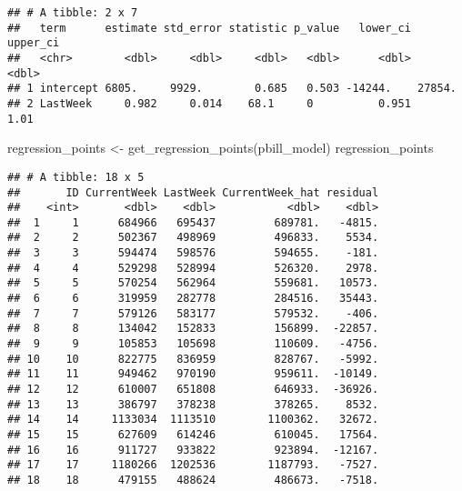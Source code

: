 \documentclass[
]{article}
\newenvironment{Shaded}{\begin{snugshade}}{\end{snugshade}}
\newcommand{\FunctionTok}[1]{\textcolor[rgb]{0.00,0.00,0.00}{#1}}
\newcommand{\NormalTok}[1]{#1}
\newcommand{\OtherTok}[1]{\textcolor[rgb]{0.56,0.35,0.01}{#1}}
\begin{document}
\begin{verbatim}
## # A tibble: 2 x 7
##   term      estimate std_error statistic p_value   lower_ci upper_ci
##   <chr>        <dbl>     <dbl>     <dbl>   <dbl>      <dbl>    <dbl>
## 1 intercept 6805.     9929.        0.685   0.503 -14244.    27854.  
## 2 LastWeek     0.982     0.014    68.1     0          0.951     1.01
\end{verbatim}

\begin{Shaded}
\begin{Highlighting}[]
\NormalTok{regression\_points }\OtherTok{\textless{}{-}} \FunctionTok{get\_regression\_points}\NormalTok{(pbill\_model)}
\NormalTok{regression\_points}
\end{Highlighting}
\end{Shaded}

\begin{verbatim}
## # A tibble: 18 x 5
##       ID CurrentWeek LastWeek CurrentWeek_hat residual
##    <int>       <dbl>    <dbl>           <dbl>    <dbl>
##  1     1      684966   695437         689781.   -4815.
##  2     2      502367   498969         496833.    5534.
##  3     3      594474   598576         594655.    -181.
##  4     4      529298   528994         526320.    2978.
##  5     5      570254   562964         559681.   10573.
##  6     6      319959   282778         284516.   35443.
##  7     7      579126   583177         579532.    -406.
##  8     8      134042   152833         156899.  -22857.
##  9     9      105853   105698         110609.   -4756.
## 10    10      822775   836959         828767.   -5992.
## 11    11      949462   970190         959611.  -10149.
## 12    12      610007   651808         646933.  -36926.
## 13    13      386797   378238         378265.    8532.
## 14    14     1133034  1113510        1100362.   32672.
## 15    15      627609   614246         610045.   17564.
## 16    16      911727   933822         923894.  -12167.
## 17    17     1180266  1202536        1187793.   -7527.
## 18    18      479155   488624         486673.   -7518.
\end{verbatim}
\end{document}
